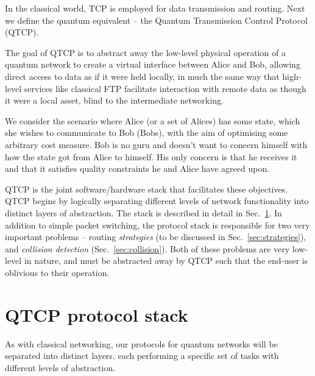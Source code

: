 \documentclass[aps,rmp,twocolumn,amsmath,amssymb,nofootinbib,superscriptaddress,longbibliography,floatfix,table-of-contents,eqsecnum]{revtex4-1}
\begin{document}
In the classical world, TCP is employed for data transmission and routing. Next we define the quantum equivalent -- the Quantum Transmission Control Protocol (QTCP).

The goal of QTCP is to abstract away the low-level physical operation of a quantum network to create a virtual interface between Alice and Bob, allowing direct access to data as if it were held locally, in much the same way that high-level services like classical FTP facilitate interaction with remote data as though it were a local asset, blind to the intermediate networking.

We consider the scenario where Alice (or a set of Alices) has some state, which she wishes to communicate to Bob (Bobs), with the aim of optimising some arbitrary cost measure. Bob is no guru and doesn't want to concern himself with how the state got from Alice to himself. His only concern is that he receives it and that it satisfies quality constraints he and Alice have agreed upon.

QTCP is the joint software/hardware stack that facilitates these objectives. QTCP begins by logically separating different levels of network functionality into distinct layers of abstraction. The stack is described in detail in Sec.~\ref{sec:prot_stack}. In addition to simple packet switching, the protocol stack is responsible for two very important problems -- routing \textit{strategies} (to be discussed in Sec.~\ref{sec:strategies}), and \textit{collision detection} (Sec.~\ref{sec:collision}). Both of these problems are very low-level in nature, and must be abstracted away by QTCP such that the end-user is oblivious to their operation.

%
%

\section{QTCP protocol stack} \label{sec:prot_stack} 

As with classical networking, our protocols for quantum networks will be separated into distinct layers, each performing a specific set of tasks with different levels of abstraction.
\end{document}
